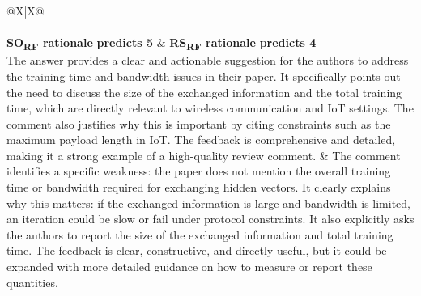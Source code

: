 \begin{table}[t]
\centering
\normalsize
\setlength{\tabcolsep}{7pt}
\renewcommand{\arraystretch}{1.3}
\begin{tabularx}{\textwidth}{@{}X|X@{}}
\toprule
{} \\
\midrule
{} \\
\midrule
{}
\textbf{SO\textsubscript{RF} rationale} \hfill \textbf{predicts 5} &
\textbf{RS\textsubscript{RF} rationale} \hfill \textbf{predicts 4} \\
The answer provides a clear and actionable suggestion for the authors to
address the training-time and bandwidth issues in their paper. It
specifically points out the need to discuss the size of the exchanged
information and the total training time, which are directly relevant to
wireless communication and IoT settings. The comment also justifies why
this is important by citing constraints such as the maximum payload length
in IoT. The feedback is comprehensive and detailed, making it a strong
example of a high-quality review comment. &
The comment identifies a specific weakness: the paper does not mention
the overall training time or bandwidth required for exchanging hidden
vectors. It clearly explains why this matters: if the exchanged information
is large and bandwidth is limited, an iteration could be slow or fail under
protocol constraints. It also explicitly asks the authors to report the
size of the exchanged information and total training time. The feedback is
clear, constructive, and directly useful, but it could be expanded with
more detailed guidance on how to measure or report these quantities.

\end{tabularx}
\end{table}
